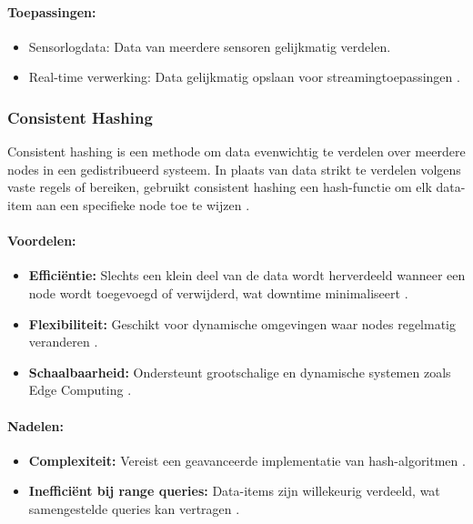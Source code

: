 \paragraph{Toepassingen:}
\begin{itemize}
    \item Sensorlogdata: Data van meerdere sensoren gelijkmatig verdelen.
    \item Real-time verwerking: Data gelijkmatig opslaan voor streamingtoepassingen \autocite{Mahmud2020}.
\end{itemize}

\subsubsection{Consistent Hashing}
Consistent hashing is een methode om data evenwichtig te verdelen over meerdere nodes in een gedistribueerd systeem. In plaats van data strikt te verdelen volgens vaste regels of bereiken, gebruikt consistent hashing een hash-functie om elk data-item aan een specifieke node toe te wijzen \autocite{Kleppmann2017}.

\paragraph{Voordelen:}
\begin{itemize}
    \item \textbf{Efficiëntie:} Slechts een klein deel van de data wordt herverdeeld wanneer een node wordt toegevoegd of verwijderd, wat downtime minimaliseert \autocite{Kleppmann2017}.
    \item \textbf{Flexibiliteit:} Geschikt voor dynamische omgevingen waar nodes regelmatig veranderen \autocite{Kleppmann2017}.
    \item \textbf{Schaalbaarheid:} Ondersteunt grootschalige en dynamische systemen zoals Edge Computing \autocite{Kleppmann2017}.
\end{itemize}

\paragraph{Nadelen:}
\begin{itemize}
    \item \textbf{Complexiteit:} Vereist een geavanceerde implementatie van hash-algoritmen \autocite{Kleppmann2017}.
    \item \textbf{Inefficiënt bij range queries:} Data-items zijn willekeurig verdeeld, wat samengestelde queries kan vertragen \autocite{Mahmud2020}.
\end{itemize}

